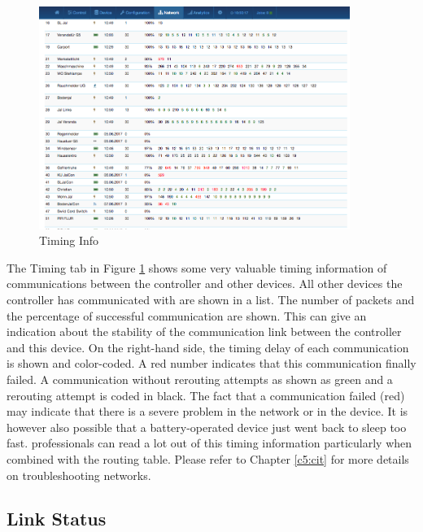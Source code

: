 \begin{figure}
\begin{center}
\includegraphics[width=0.9\textwidth]{pngs/cap7/eui25.png}
\caption{Timing Info}
\label{eui25}
\end{center}
\end{figure}

The Timing tab in Figure \ref{eui25} shows some very valuable timing information of 
communications between the controller and other devices. All other devices the controller 
has communicated with are shown in a list. The number of packets and the percentage of 
successful communication are shown. This can give an indication about the stability of 
the communication link between the controller and this device. On the right-hand side, 
the timing delay of each communication is shown and color-coded. A red number indicates 
that this communication finally failed. A communication without rerouting attempts as 
shown as green and a rerouting attempt is coded in black. The fact that a communication 
failed (red) may indicate that there is a severe problem in the network or in the device. 
It is however also possible that a battery-operated device just went back to sleep too fast. 
\zwave professionals can read a lot out of this timing information particularly when combined 
with the routing table. Please refer to Chapter \ref{c5:cit} for more details on 
troubleshooting \zwave networks.


\subsection{Link Status}


